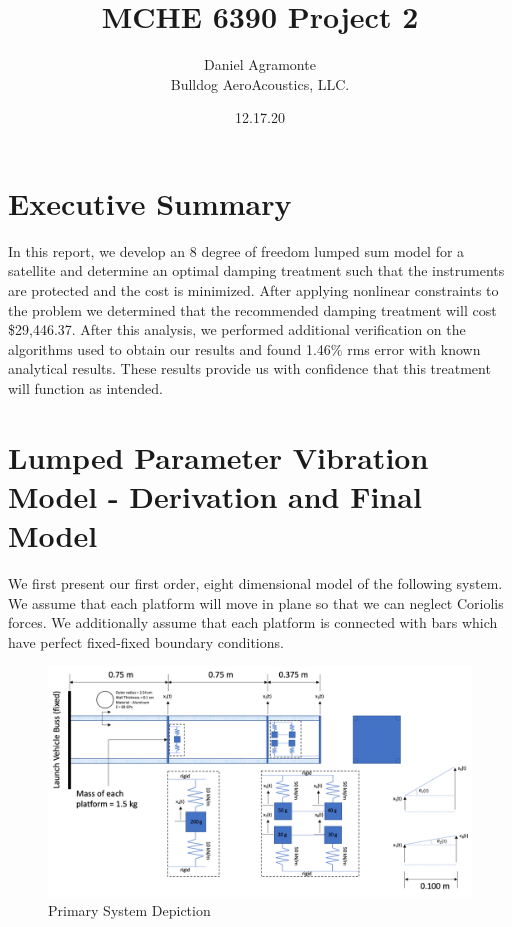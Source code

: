 \documentclass{article}
\title{\Huge MCHE 6390 Project 2}
\author{Daniel Agramonte \\ Bulldog AeroAcoustics, LLC.}
\date{12.17.20}
\begin{document}
\maketitle
\section*{Executive Summary}
In this report, we develop an 8 degree of freedom lumped sum model for a satellite and determine an optimal damping treatment such that the instruments are protected and the cost is minimized. After applying nonlinear constraints to the problem we determined that the recommended damping treatment will cost \$29,446.37. After this analysis, we performed additional verification on the algorithms used to obtain our results and found 1.46\% rms error with known analytical results. These results provide us with confidence that this treatment will function as intended. 
\section*{Lumped Parameter Vibration Model - Derivation and Final Model}
We first present our first order, eight dimensional model of the following system. We assume that each platform will move in plane so that we can neglect Coriolis forces. We additionally assume that each platform is connected with bars which have perfect fixed-fixed boundary conditions.

\begin{figure}[H]
    \vspace{-10pt}
    \includegraphics[width=1\textwidth,left]{MCHE 6390/Project 2/Figures/Figure_1.png}
    \captionsetup{justification=raggedright,singlelinecheck=false}
    \caption{Primary System Depiction}
    \label{fig:Main}
\end{figure}
\end{document}
